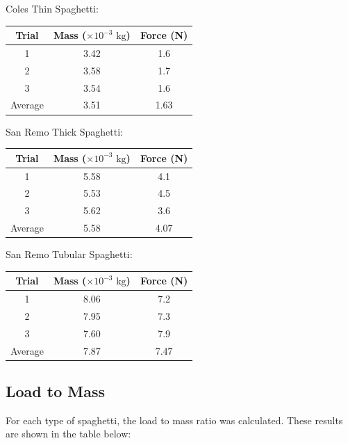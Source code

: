 \documentclass[a4paper,11pt]{article}
\begin{document}
Coles Thin Spaghetti:

\begin{center}
\begin{tabular}{|c|c|c|}
\hline
Trial & Mass ($\times 10^{-3}\mbox{ kg}$) & Force (N) \\
\hline
1       & 3.42 & 1.6 \\
2       & 3.58 & 1.7 \\
3       & 3.54 & 1.6 \\
\hline
Average & 3.51 & 1.63 \\
\hline
\end{tabular}
\end{center}

San Remo Thick Spaghetti:

\begin{center}
\begin{tabular}{|c|c|c|}
\hline
Trial & Mass ($\times 10^{-3}\mbox{ kg}$) & Force (N) \\
\hline
1       & 5.58 & 4.1 \\
2       & 5.53 & 4.5 \\
3       & 5.62 & 3.6 \\
\hline
Average & 5.58 & 4.07 \\
\hline
\end{tabular}
\end{center}

San Remo Tubular Spaghetti:

\begin{center}
\begin{tabular}{|c|c|c|}
\hline
Trial & Mass ($\times 10^{-3}\mbox{ kg}$) & Force (N) \\
\hline
1       & 8.06 & 7.2 \\
2       & 7.95 & 7.3 \\
3       & 7.60 & 7.9 \\
\hline
Average & 7.87 & 7.47 \\
\hline
\end{tabular}
\end{center}


\subsection{Load to Mass}

For each type of spaghetti, the load to mass ratio was calculated. These results
are shown in the table below:
\end{document}
